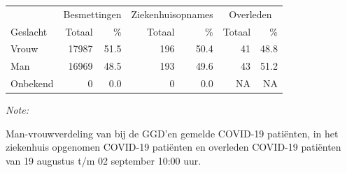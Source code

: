 \documentclass[
  english,
  man,floatsintext]{apa6}
\begin{document}
\begin{table}
\centering\begingroup\fontsize{11}{13}\selectfont

\begin{threeparttable}
\begin{tabular}{lrrrrrr}
\toprule
\multicolumn{1}{c}{ } & \multicolumn{2}{c}{Besmettingen} & \multicolumn{2}{c}{Ziekenhuisopnames} & \multicolumn{2}{c}{Overleden} \\
\cmidrule(l{3pt}r{3pt}){2-3} \cmidrule(l{3pt}r{3pt}){4-5} \cmidrule(l{3pt}r{3pt}){6-7}
Geslacht & Totaal & \% & Totaal & \% & Totaal & \%\\
\midrule
Vrouw & 17987 & 51.5 & 196 & 50.4 & 41 & 48.8\\
Man & 16969 & 48.5 & 193 & 49.6 & 43 & 51.2\\
Onbekend & 0 & 0.0 & 0 & 0.0 & NA & NA\\
\bottomrule
\end{tabular}
\begin{tablenotes}
\item \textit{Note: } 
\item Man-vrouwverdeling van bij de GGD’en gemelde COVID-19 patiënten, in het ziekenhuis opgenomen COVID-19 patiënten en overleden COVID-19 patiënten van 19 augustus t/m 02 september 10:00 uur.
\end{tablenotes}
\end{threeparttable}
\endgroup{}
\end{table}
\newpage
\end{document}
